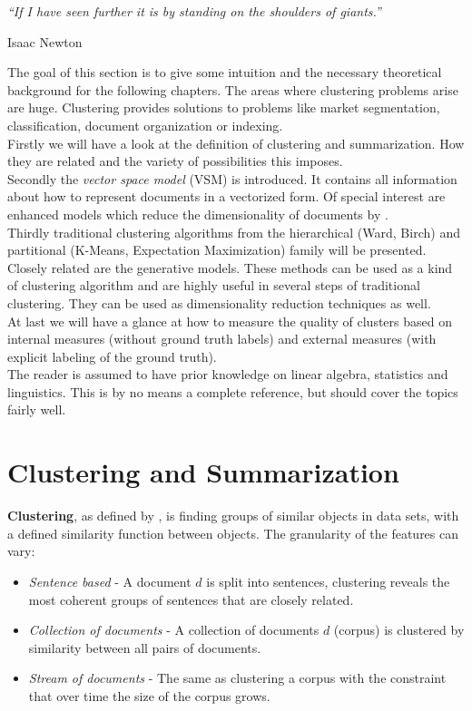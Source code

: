 \epigraph{\emph{
  ``If I have seen further it is by standing on the shoulders of giants.''
}}{ Isaac Newton }

The goal of this section is to give some intuition and the necessary theoretical background for the following chapters. The areas where clustering problems arise are huge. Clustering provides solutions to problems like market segmentation, classification, document organization or indexing.\\
Firstly we will have a look at the definition of clustering and summarization. How they are related and the variety of possibilities this imposes.\\
Secondly the \emph{vector space model} (VSM) is introduced. It contains all information about how to represent documents in a vectorized form. Of special interest are enhanced models which reduce the dimensionality of documents by \svdfull{}.\\
Thirdly traditional clustering algorithms from the hierarchical (Ward, Birch) and partitional (K-Means, Expectation Maximization) family will be presented. Closely related are the generative models. These methods can be used as a kind of clustering algorithm and are highly useful in several steps of traditional clustering. They can be used as dimensionality reduction techniques as well.\\
At last we will have a glance at how to measure the quality of clusters based on internal measures (without ground truth labels) and external measures (with explicit labeling of the ground truth).\\
The reader is assumed to have prior knowledge on linear algebra, statistics and linguistics. This is by no means a complete reference, but should cover the topics fairly well.


\section{Clustering and Summarization}
\label{sec:basics_intro}

  \textbf{Clustering}, as defined by \cite{ClusterAlgoSurveyIBM}, is finding groups of similar objects in data sets, with a defined similarity function between objects. The granularity of the features can vary:

  \begin{itemize}
    \item \emph{Sentence based} - A document $d$ is split into sentences, clustering reveals the most coherent groups of sentences that are closely related.
    \item \emph{Collection of documents} - A collection of documents $d$ (corpus) is clustered by similarity between all pairs of documents.
    \item \emph{Stream of documents} - The same as clustering a corpus with the constraint that over time the size of the corpus grows.
  \end{itemize}

